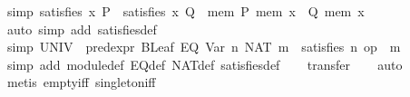 \begin{isabellebody}
\ {}simp{}{}\ {}satisfies\ x\ P\ {}\ satisfies\ x\ Q\ {}\ {}{}mem{}\ P\ {}mem\ x{}\ {}\ Q\ {}mem\ x{}{}{}\isanewline
%
\isadelimproof
\ \ %
\endisadelimproof
%
\isatagproof
{}\isamarkupfalse%
\ {}auto\ simp\ add{}\ satisfies{}def{}%
\endisatagproof
{\isafoldproof}%
%
\isadelimproof
\isanewline
%
\endisadelimproof
\isanewline
{}\isamarkupfalse%
\ {}simp{}{}\ {}UNIV\ {}\ pred{}expr\ {}BLeaf\ {}EQ\ {}Var\ n{}\ {}NAT\ m{}{}{}\ {}\ satisfies\ n\ {}op\ {}\ m{}{}\isanewline
%
\isadelimproof
\ \ %
\endisadelimproof
%
\isatagproof
{}\isamarkupfalse%
\ {}simp\ add{}\ module{}def\ EQ{}def\ NAT{}def\ satisfies{}def{}\isanewline
\ \ \isamarkupfalse%
\ transfer\isanewline
\ \ \isamarkupfalse%
\ auto\isanewline
\ \ \isamarkupfalse%
\ {}metis\ empty{}iff\ singleton{}iff{}%

\end{isabellebody}

